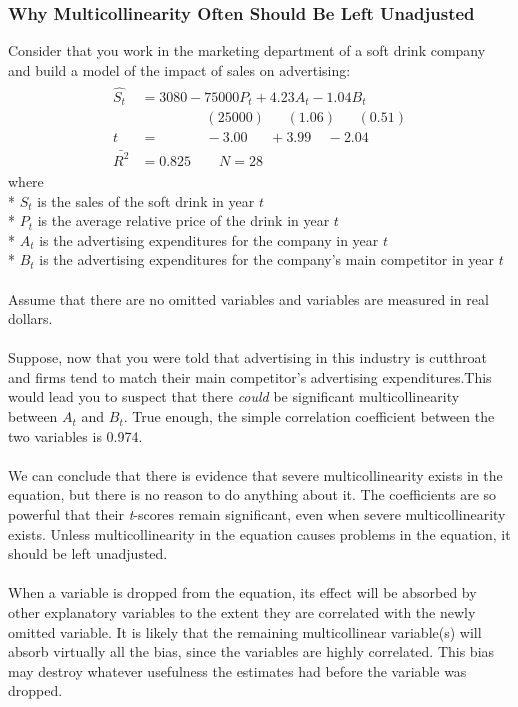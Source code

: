 \documentclass[11pt]{article}
\begin{document}
\subsubsection{Why Multicollinearity Often Should Be Left Unadjusted}
Consider that you work in the marketing department of a soft drink company and build a model of the impact of sales on advertising:
\begin{align}
\label{eg8_19}
\begin{split}
\hat{S_t} &= 3080 - {75000P_t} + {4.23A_t} - {1.04B_t}\\
&\>\>\>\>\>\>\>\>\>\>\>\>\>\>\>\>\>\>\>\>\> (25000) 
\>\>\>\>\>\>\> (1.06)
\>\>\>\>\>\>\> (0.51)\\
t&=\>\>\>\>\>\>\>\>\>\>\>\>\>\>\> -3.00 
\>\>\>\>\>\>\> +3.99
\>\>\>\>\> -2.04\\
\bar{R^2}&= 0.825 \quad\quad N=28
\end{split}
\end{align}
where\\*
$S_t$ is the sales of the soft drink in year $t$\\*
$P_t$ is the average relative price of the drink in year $t$\\*
$A_t$ is the advertising expenditures for the company in year $t$\\*
$B_t$ is the advertising expenditures for the company's main competitor in year $t$\\ \\
Assume that there are no omitted variables and variables are measured in real dollars.\\ \\
Suppose, now that you were told that advertising in this industry is cutthroat and firms tend to match their main competitor's advertising expenditures.This would lead you to suspect that there \textit{could} be significant multicollinearity between $A_t$ and $B_t$. True enough, the simple correlation coefficient between the two variables is 0.974.\\ \\
We can conclude that there is evidence that severe multicollinearity exists in the equation, but there is no reason to do anything about it. The coefficients are so powerful that their \textit{t}-scores remain significant, even when severe multicollinearity exists. Unless multicollinearity in the equation causes problems in the equation, it should be left unadjusted.\\ \\
When a variable is dropped from the equation, its effect will be absorbed by other explanatory variables to the extent they are correlated with the newly omitted variable. It is likely that the remaining multicollinear variable(s) will absorb virtually all the bias, since the variables are highly correlated. This bias may destroy whatever usefulness the estimates had before the variable was dropped. \\ \\
\end{document}

